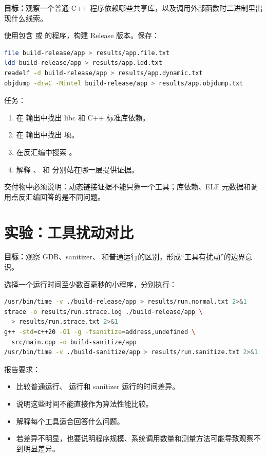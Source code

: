 \begin{labbox}
\textbf{目标：}观察一个普通 C++ 程序依赖哪些共享库，以及调用外部函数时二进制里出现什么线索。

使用包含  或  的程序，构建 Release 版本。保存：

\begin{lstlisting}[language=bash]
file build-release/app > results/app.file.txt
ldd build-release/app > results/app.ldd.txt
readelf -d build-release/app > results/app.dynamic.txt
objdump -drwC -Mintel build-release/app > results/app.objdump.txt
\end{lstlisting}

任务：

\begin{enumerate}
  \item 在  输出中找出 libc 和 C++ 标准库依赖。
  \item 在  输出中找出  项。
  \item 在反汇编中搜索 。
  \item 解释 、 和  分别站在哪一层提供证据。
\end{enumerate}

交付物中必须说明：动态链接证据不能只靠一个工具；库依赖、ELF 元数据和调用点反汇编回答的是不同问题。
\end{labbox}

\section{实验：工具扰动对比}

\begin{labbox}
\textbf{目标：}观察 GDB、sanitizer、 和普通运行的区别，形成“工具有扰动”的边界意识。

选择一个运行时间至少数百毫秒的小程序，分别执行：

\begin{lstlisting}[language=bash]
/usr/bin/time -v ./build-release/app > results/run.normal.txt 2>&1
strace -o results/run.strace.log ./build-release/app \
  > results/run.strace.txt 2>&1
g++ -std=c++20 -O1 -g -fsanitize=address,undefined \
  src/main.cpp -o build-sanitize/app
/usr/bin/time -v ./build-sanitize/app > results/run.sanitize.txt 2>&1
\end{lstlisting}

报告要求：

\begin{itemize}
  \item 比较普通运行、 运行和 sanitizer 运行的时间差异。
  \item 说明这些时间不能直接作为算法性能比较。
  \item 解释每个工具适合回答什么问题。
  \item 若差异不明显，也要说明程序规模、系统调用数量和测量方法可能导致观察不到明显差异。
\end{itemize}
\end{labbox}

